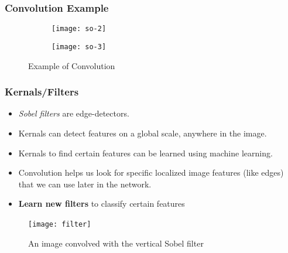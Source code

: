 \documentclass[aspectratio=169, 10pt]{beamer}
\begin{document}
\begin{frame}

	\frametitle{Convolution Example}
	\begin{figure}[ht]
		\begin{subfigure}{.5\textwidth}
  		\centering
  		\texttt{[image: so-2]}  
  
		\end{subfigure}

		\begin{subfigure}{.5\textwidth}
  		\centering
  		\texttt{[image: so-3]}
		\end{subfigure}
	\caption{Example of Convolution}

\end{figure}
\end{frame}


\begin{frame}
	\frametitle{Kernals/Filters}
	\begin{itemize}
		\item \textit{Sobel filters} are edge-detectors.
		\item Kernals can detect features on a global scale, anywhere in the image.
		\item Kernals to find certain features can be learned using machine learning.
		\item Convolution helps us look for specific localized image features (like edges) that we can use later in the network.
		\item \textbf{Learn new filters} to classify certain features
	\end{itemize}
	
\begin{figure}
\texttt{[image: filter]}
\centering \
\caption{An image convolved with the vertical Sobel filter}
\end{figure}
\end{frame}

\end{document}

